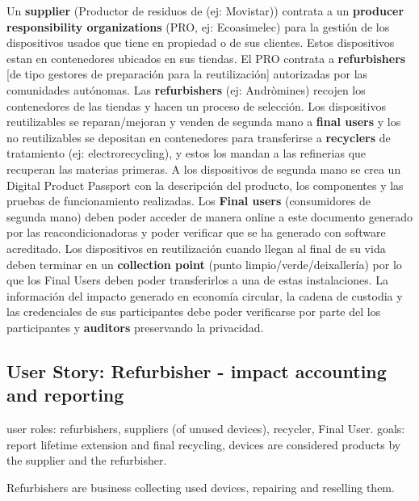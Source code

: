 \documentclass[
]{book}
\begin{document}
Un \textbf{supplier} (Productor de residuos de (ej: Movistar)) contrata a un \textbf{producer responsibility organizations} (PRO, ej: Ecoasimelec) para la gestión de los dispositivos usados que tiene en propiedad o de sus clientes. Estos dispositivos estan en contenedores ubicados en sus tiendas. El PRO contrata a \textbf{refurbishers} {[}de tipo gestores de preparación para la reutilización{]} autorizadas por las comunidades autónomas. Las \textbf{refurbishers} (ej: Andròmines) recojen los contenedores de las tiendas y hacen un proceso de selección. Los dispositivos reutilizables se reparan/mejoran y venden de segunda mano a \textbf{final users} y los no reutilizables se depositan en contenedores para transferirse a \textbf{recyclers} de tratamiento (ej: electrorecycling), y estos los mandan a las refinerias que recuperan las materias primeras. A los dispositivos de segunda mano se crea un Digital Product Passport con la descripción del producto, los componentes y las pruebas de funcionamiento realizadas. Los \textbf{Final users} (consumidores de segunda mano) deben poder acceder de manera online a este documento generado por las reacondicionadoras y poder verificar que se ha generado con software acreditado. Los dispositivos en reutilización cuando llegan al final de su vida deben terminar en un \textbf{collection point} (punto limpio/verde/deixallería) por lo que los Final Users deben poder transferirlos a una de estas instalaciones. La información del impacto generado en economía circular, la cadena de custodia y las credenciales de sus participantes debe poder verificarse por parte del los participantes y \textbf{auditors} preservando la privacidad.

\hypertarget{user-story-refurbisher---impact-accounting-and-reporting}{%
\subsection{User Story: Refurbisher - impact accounting and reporting}\label{user-story-refurbisher---impact-accounting-and-reporting}}

user roles: refurbishers, suppliers (of unused devices), recycler, Final User.
goals: report lifetime extension and final recycling, devices are considered products by the supplier and the refurbisher.

Refurbishers are business collecting used devices, repairing and reselling them.
\end{document}
